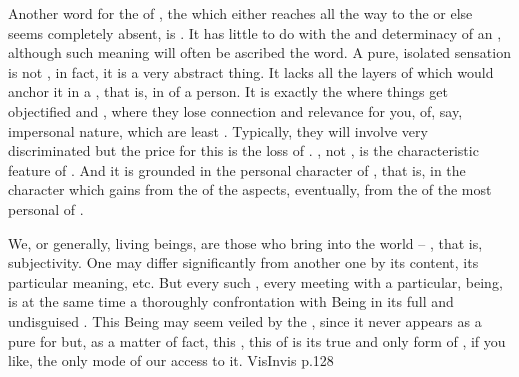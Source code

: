 \pa
Another word for the  of , the  which either reaches
all the way to the  or else seems completely absent, is 
. It has little to do with the  and 
determinacy of an , although such meaning will often be ascribed the
word. A pure, isolated sensation is not , in fact, it 
is a very abstract thing. It lacks all the layers of 
 which would anchor it in a  
, that is, in  of a person. It is 
exactly the  where things get {objectified} and  
, where they lose connection and relevance for you, 
 of, say, impersonal nature, which are least 
. Typically, they will involve very  
discriminated  but the price for this  is 
the loss of . , not , is 
the characteristic feature of . And it is grounded in 
the personal character of , that is, in the character 
which  gains from the  of the 
 aspects, eventually, from the  of the 
most personal  of .

We, or generally, living beings, are those who bring
 into the world -- , that is,
subjectivity.  One 
 may differ significantly from another one by
its  content, its particular meaning, etc.  But every
such , every meeting with a particular, 
being, is at the same time a thoroughly  confrontation
with Being in its full and undisguised .  This Being may
seem veiled by the , since it never appears as a pure
 for  but, as a matter of fact, this
, this  of  is its true
and only form of , if you like, the only mode of our 
access to it. \citet{If coincidence is lost, then it is not an 
accident; if Being remains hidden, then this is precisely its very 
feature and no unveiling will allow us understand it.}{VisInvis}{ p.128}

